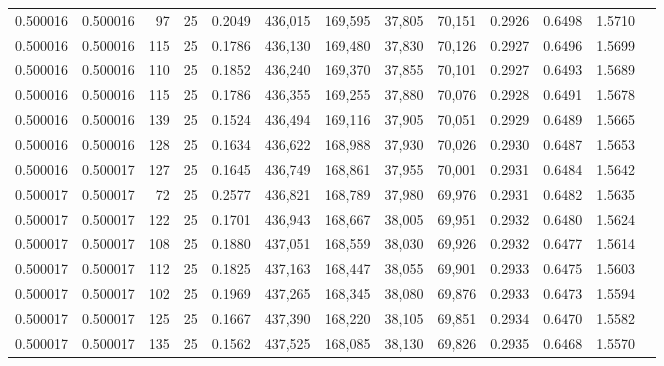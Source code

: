 \begin{tabular}{rrrrrrrrrrrrr}
0.500016 & 0.500016 &    97 &  25 &                                     0.2049 & 436,015 & 169,595 &  37,805 &  70,151 & 0.2926 & 0.6498 & 1.5710 \\
0.500016 & 0.500016 &   115 &  25 &                                     0.1786 & 436,130 & 169,480 &  37,830 &  70,126 & 0.2927 & 0.6496 & 1.5699 \\
0.500016 & 0.500016 &   110 &  25 &                                     0.1852 & 436,240 & 169,370 &  37,855 &  70,101 & 0.2927 & 0.6493 & 1.5689 \\
0.500016 & 0.500016 &   115 &  25 &                                     0.1786 & 436,355 & 169,255 &  37,880 &  70,076 & 0.2928 & 0.6491 & 1.5678 \\
0.500016 & 0.500016 &   139 &  25 &                                     0.1524 & 436,494 & 169,116 &  37,905 &  70,051 & 0.2929 & 0.6489 & 1.5665 \\
0.500016 & 0.500016 &   128 &  25 &                                     0.1634 & 436,622 & 168,988 &  37,930 &  70,026 & 0.2930 & 0.6487 & 1.5653 \\
0.500016 & 0.500017 &   127 &  25 &                                     0.1645 & 436,749 & 168,861 &  37,955 &  70,001 & 0.2931 & 0.6484 & 1.5642 \\
0.500017 & 0.500017 &    72 &  25 &                                     0.2577 & 436,821 & 168,789 &  37,980 &  69,976 & 0.2931 & 0.6482 & 1.5635 \\
0.500017 & 0.500017 &   122 &  25 &                                     0.1701 & 436,943 & 168,667 &  38,005 &  69,951 & 0.2932 & 0.6480 & 1.5624 \\
0.500017 & 0.500017 &   108 &  25 &                                     0.1880 & 437,051 & 168,559 &  38,030 &  69,926 & 0.2932 & 0.6477 & 1.5614 \\
0.500017 & 0.500017 &   112 &  25 &                                     0.1825 & 437,163 & 168,447 &  38,055 &  69,901 & 0.2933 & 0.6475 & 1.5603 \\
0.500017 & 0.500017 &   102 &  25 &                                     0.1969 & 437,265 & 168,345 &  38,080 &  69,876 & 0.2933 & 0.6473 & 1.5594 \\
0.500017 & 0.500017 &   125 &  25 &                                     0.1667 & 437,390 & 168,220 &  38,105 &  69,851 & 0.2934 & 0.6470 & 1.5582 \\
0.500017 & 0.500017 &   135 &  25 &                                     0.1562 & 437,525 & 168,085 &  38,130 &  69,826 & 0.2935 & 0.6468 & 1.5570 \\

\end{tabular}
